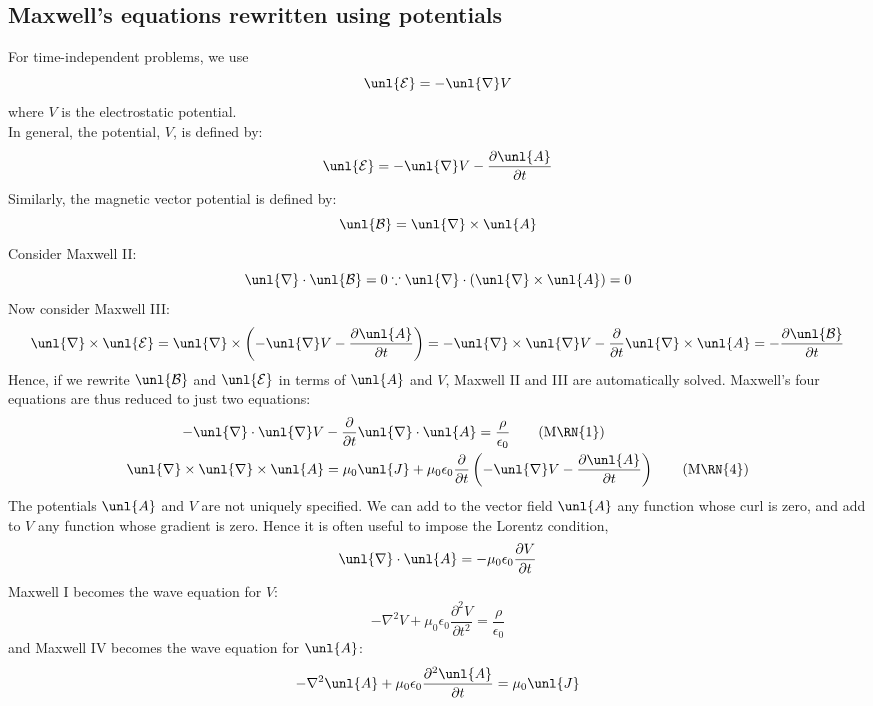 \documentclass[a4paper, 11pt, normalem]{report}
\newcommand\p{\partial}
\newcommand\E{\mathcal{E}}
\newcommand\uE{\unl{\E}}
\newcommand\B{\mathcal{B}}
\newcommand\uB{\unl{\B}}
\newcommand\del{\unl{\nabla}}
\newcommand\eno{\epsilon_0}
\newcommand\J{\unl{J}}
\newcommand\A{\unl{A}}
\begin{document}
\subsection{Maxwell's equations rewritten using potentials}
For time-independent problems, we use
\begin{equation}
	\uE = -\del V
\end{equation}
where $V$ is the electrostatic potential. \\
In general, the potential, $V$, is defined by:
\begin{equation}
	\uE = -\del V - \frac{\p \A}{\p t}
\end{equation}
Similarly, the magnetic vector potential is defined by:
\begin{equation}
	\uB = \del\times\A
\end{equation}
Consider Maxwell \RN{2}:
\begin{equation}
	\del\cdot\uB = 0 \because \del\cdot(\del\times\A) = 0
\end{equation}
Now consider Maxwell \RN{3}:
\begin{equation}
	\del\times\uE = \del\times\left(-\del V - \frac{\p\A}{\p t}\right) = -\del\times\del V - \frac{\p}{\p t}\del\times\A = -\frac{\p \uB}{\p t}
\end{equation}
Hence, if we rewrite $\uB$ and $\uE$ in terms of $\A$ and $V$, Maxwell \RN{2} and \RN{3} are automatically solved.
Maxwell's four equations are thus reduced to just two equations:
\begin{align}
	-\del\cdot\del V &- \frac{\p}{\p t}\del\cdot\A = \frac{\rho}{\eno}  \tag{M\RN{1}} \\
	\del\times\del\times\A &= \mu_0\J + \mu_0\eno\frac{\p}{\p t}\left(-\del V - \frac{\p\A}{\p t}\right) \tag{M\RN{4}}
\end{align}
The potentials $\A$ and $V$ are not uniquely specified.
We can add to the vector field $\A$ any function whose curl is zero, and add to $V$ any function whose gradient is zero.
Hence it is often useful to impose the Lorentz condition,
\begin{equation}
	\del\cdot\A = -\mu_0\eno\frac{\p V}{\p t}
\end{equation}
Maxwell \RN{1} becomes the wave equation for $V$:
\begin{equation}
	-\nabla^2V + \mu_0\eno\frac{\p^2V}{\p t^2} = \frac{\rho}{\eno}
\end{equation}
and Maxwell \RN{4} becomes the wave equation for $\A$:
\begin{equation}
	-\nabla^2\A + \mu_0\eno\frac{\p^2\A}{\p t} = \mu_0\J
\end{equation}
\end{document}
